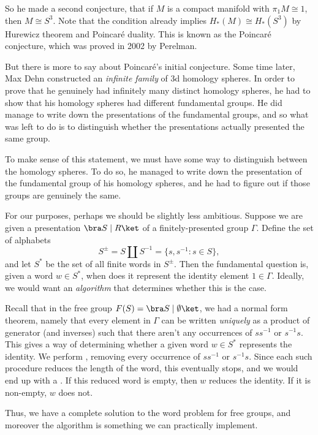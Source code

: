 \documentclass[a4paper]{article}
\begin{document}
So he made a second conjecture, that if $M$ is a compact manifold with $\pi_1M \cong 1$, then $M \cong S^3$. Note that the condition already implies $H_*(M) \cong H_*(S^3)$ by Hurewicz theorem and Poincar\'e duality. This is known as the Poincar\'e conjecture, which was proved in 2002 by Perelman.

But there is more to say about Poincar\'e's initial conjecture. Some time later, Max Dehn constructed an \emph{infinite family} of 3d homology spheres. In order to prove that he genuinely had infinitely many distinct homology spheres, he had to show that his homology spheres had different fundamental groups. He did manage to write down the presentations of the fundamental groups, and so what was left to do is to distinguish whether the presentations actually presented the same group.

To make sense of this statement, we must have some way to distinguish between the homology spheres. To do so, he managed to write down the presentation of the fundamental group of his homology spheres, and he had to figure out if those groups are genuinely the same.

For our purposes, perhaps we should be slightly less ambitious. Suppose we are given a presentation $\bra S \mid R\ket$ of a finitely-presented group $\Gamma$. Define the set of alphabets
\[
  S^{\pm} = S \amalg S^{-1} = \{ s, s^{-1}: s \in S\},
\]
and let $S^*$ be the set of all finite words in $S^{\pm}$. Then the fundamental question is, given a word $w \in S^*$, when does it represent the identity element $1 \in \Gamma$. Ideally, we would want an \emph{algorithm} that determines whether this is the case.

\begin{eg}
  Recall that in the free group $F(S) = \bra S \mid \emptyset\ket$, we had a normal form theorem, namely that every element in $\Gamma$ can be written \emph{uniquely} as a product of generator (and inverses) such that there aren't any occurrences of $ss^{-1}$ or $s^{-1}s$. This gives a way of determining whether a given word $w \in S^*$ represents the identity. We perform , removing every occurrence of $ss^{-1}$ or $s^{-1}s$. Since each such procedure reduces the length of the word, this eventually stops, and we would end up with a . If this reduced word is empty, then $w$ reduces the identity. If it is non-empty, $w$ does not.
\end{eg}
Thus, we have a complete solution to the word problem for free groups, and moreover the algorithm is something we can practically implement.
\end{document}
